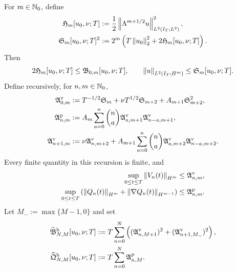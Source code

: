 \begin{proposition}
\label{u:prop:qc-critical-height-row-propagation}
For \(m\in\mathbb N_0\), define
\begin{align}
 \mathfrak H_m[u_0,\nu;T]
 &:={}
 \frac12\left\lVert \Lambda^{m+1/2}u\right\rVert_{L^2(I_T;L^2)}^2,
 \label{u:eq:qc-height-producer-coordinate}\\
 \mathfrak S_m[u_0,\nu;T]^2
 &:={}
 2^m\left(T\left\lVert u_0\right\rVert_2^2+2\mathfrak H_m[u_0,\nu;T]\right).
 \label{u:eq:qc-spatial-row-from-height}
\end{align}
Then
\begin{equation}
 2\mathfrak H_m[u_0,\nu;T]
 \le\mathfrak B_{0,m}[u_0,\nu;T],
 \qquad
 \left\lVert u\right\rVert_{L^2(I_T;H^m)}\le\mathfrak S_m[u_0,\nu;T].
 \label{u:eq:qc-height-spatial-bounds}
\end{equation}
Define recursively, for \(n,m\in\mathbb N_0\),
\begin{align}
 \mathfrak A^{\rm v}_{0,m}
 &:={}
 T^{-1/2}\mathfrak S_m
 +\nu T^{1/2}\mathfrak S_{m+2}
 +A_{m+1}\mathfrak S_{m+2}^2,
 \label{u:eq:qc-height-base-pointwise-majorant}\\
 \mathfrak A^{\rm p}_{n,m}
 &:={}
 A_m\sum_{a=0}^{n}\binom na
 \mathfrak A^{\rm v}_{a,m+1}
 \mathfrak A^{\rm v}_{n-a,m+1},
 \label{u:eq:qc-height-pressure-majorant}\\
 \mathfrak A^{\rm v}_{n+1,m}
 &:={}
 \nu\mathfrak A^{\rm v}_{n,m+2}
 +A_{m+1}\sum_{a=0}^{n}\binom na
 \mathfrak A^{\rm v}_{a,m+2}
 \mathfrak A^{\rm v}_{n-a,m+2}.
 \label{u:eq:qc-height-temporal-majorant}
\end{align}
Every finite quantity in this recursion is finite, and
\begin{align}
 \sup_{0\le t\le T}\left\lVert V_n(t)\right\rVert_{H^m}
 &\le\mathfrak A^{\rm v}_{n,m},
 \label{u:eq:qc-height-temporal-row-bound}\\
 \sup_{0\le t\le T}
 \left(\left\lVert Q_n(t)\right\rVert_{H^m}
 +\left\lVert \nabla Q_n(t)\right\rVert_{H^{m-1}}\right)
 &\le\mathfrak A^{\rm p}_{n,m}.
 \label{u:eq:qc-height-pressure-row-bound}
\end{align}
Let \(M_-:=\max\{M-1,0\}\) and set
\begin{align}
 \widehat{\mathfrak B}_{N,M}^{\rm h}[u_0,\nu;T]
 &:={}
 T\sum_{n=0}^{N}\left(
 (\mathfrak A^{\rm v}_{n,M+1})^2
 +(\mathfrak A^{\rm v}_{n+1,M_-})^2
 \right),
 \label{u:eq:qc-height-reconstructed-rectangle}\\
 \widehat{\mathfrak Q}_{N,M}^{\rm h}[u_0,\nu;T]
 &:={}
 T\sum_{n=0}^{N}\mathfrak A^{\rm p}_{n,M}.
 \label{u:eq:qc-height-reconstructed-pressure}

\end{align}
\end{proposition}
